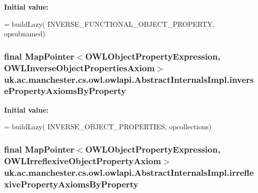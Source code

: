 {\bfseries Initial value\-:}
\begin{DoxyCode}
= buildLazy(
            INVERSE\_FUNCTIONAL\_OBJECT\_PROPERTY, opsubnamed)
\end{DoxyCode}
\hypertarget{classuk_1_1ac_1_1manchester_1_1cs_1_1owl_1_1owlapi_1_1_abstract_internals_impl_abda7f39bce3f3c9e953d07882e66e4f6}{
\subsubsection[{inverse\-Property\-Axioms\-By\-Property}]{\setlength{\rightskip}{0pt plus 5cm}final Map\-Pointer$<${\bf O\-W\-L\-Object\-Property\-Expression}, {\bf O\-W\-L\-Inverse\-Object\-Properties\-Axiom}$>$ uk.\-ac.\-manchester.\-cs.\-owl.\-owlapi.\-Abstract\-Internals\-Impl.\-inverse\-Property\-Axioms\-By\-Property\hspace{0.3cm}{\ttfamily [protected]}}}\label{classuk_1_1ac_1_1manchester_1_1cs_1_1owl_1_1owlapi_1_1_abstract_internals_impl_abda7f39bce3f3c9e953d07882e66e4f6}
{\bfseries Initial value\-:}
\begin{DoxyCode}
= buildLazy(
            INVERSE\_OBJECT\_PROPERTIES, opcollections)
\end{DoxyCode}
\hypertarget{classuk_1_1ac_1_1manchester_1_1cs_1_1owl_1_1owlapi_1_1_abstract_internals_impl_a4115a6a77b6c2efb691891e6db630e32}{
\subsubsection[{irreflexive\-Property\-Axioms\-By\-Property}]{\setlength{\rightskip}{0pt plus 5cm}final Map\-Pointer$<${\bf O\-W\-L\-Object\-Property\-Expression}, {\bf O\-W\-L\-Irreflexive\-Object\-Property\-Axiom}$>$ uk.\-ac.\-manchester.\-cs.\-owl.\-owlapi.\-Abstract\-Internals\-Impl.\-irreflexive\-Property\-Axioms\-By\-Property\hspace{0.3cm}{\ttfamily [protected]}}}\label{classuk_1_1ac_1_1manchester_1_1cs_1_1owl_1_1owlapi_1_1_abstract_internals_impl_a4115a6a77b6c2efb691891e6db630e32}
